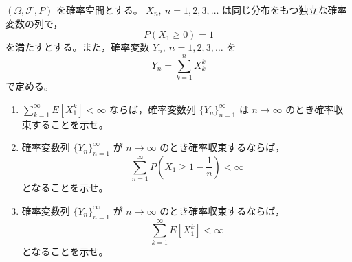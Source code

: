 \documentclass[12pt]{jlreq}
\begin{document}
\((\Omega,\mathcal F,P)\) を確率空間とする。
\(X_n,\ n=1,2,3,\ldots\) は同じ分布をもつ独立な確率変数の列で，
\[
  P(X_1\ge0)=1
\]
を満たすとする。また，確率変数 \(Y_n,\ n=1,2,3,\ldots\) を
\[
  Y_n=\sum_{k=1}^{n}X_k^k
\]
で定める。

\begin{enumerate}
  \item \(\displaystyle \sum_{k=1}^{\infty}E[X_1^k]<\infty\) ならば，確率変数列
  \(\{Y_n\}_{n=1}^{\infty}\) は \(n\to\infty\) のとき確率収束することを示せ。
  \item 確率変数列 \(\{Y_n\}_{n=1}^{\infty}\) が \(n\to\infty\) のとき確率収束するならば，
  \[
    \sum_{n=1}^{\infty}P\left(X_1\ge 1-\frac1n\right)<\infty
  \]
  となることを示せ。
  \item 確率変数列 \(\{Y_n\}_{n=1}^{\infty}\) が \(n\to\infty\) のとき確率収束するならば，
  \[
    \sum_{k=1}^{\infty}E[X_1^k]<\infty
  \]
  となることを示せ。
\end{enumerate}
\end{document}
